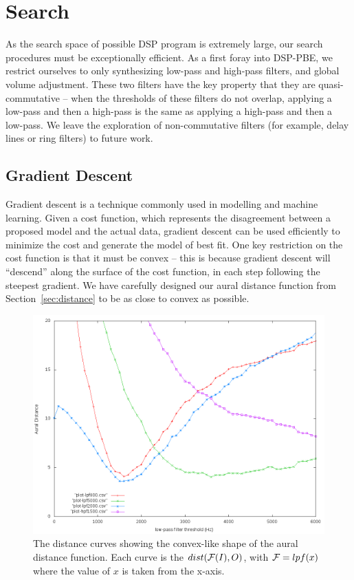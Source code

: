 \section{Search}
\label{sec:search}

As the search space of possible DSP program is extremely large, our search procedures must be exceptionally efficient. 
As a first foray into DSP-PBE, we restrict ourselves to only synthesizing low-pass and high-pass filters, and global volume adjustment.
These two filters have the key property that they are quasi-commutative -- when the thresholds of these filters do not overlap, applying a low-pass and then a high-pass is the same as applying a high-pass and then a low-pass.
We leave the exploration of non-commutative filters (for example, delay lines or ring filters) to future work.

\subsection{Gradient Descent}

Gradient descent is a technique commonly used in modelling and machine learning.
Given a cost function, which represents the disagreement between a proposed model and the actual data, gradient descent can be used efficiently to minimize the cost and generate the model of best fit.
One key restriction on the cost function is that it must be convex -- this is because gradient descent will ``descend'' along the surface of the cost function, in each step following the steepest gradient.
We have carefully designed our aural distance function from Section~\ref{sec:distance} to be as close to convex as possible.

\begin{figure}[!h]
\includegraphics[width=\columnwidth]{figs/distCurves} 
\caption{The distance curves showing the convex-like shape of the aural distance function. Each curve is the $dist(\mathcal{F}(I),O)$, with $\mathcal{F} = lpf(x)$ where the value of $x$ is taken from the x-axis.}
\label{fig:distCurves}
\end{figure}

